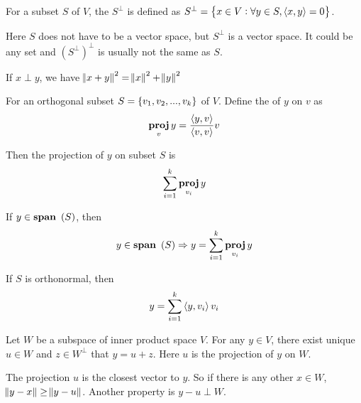 \begin{definition}
    For a subset $S$ of $V$, the  $S^\perp$ is defined as $S^\perp=\set{x \in V: \forall y \in S, \innerproduct{x}{y} = 0}$.
\end{definition}

Here $S$ does not have to be a vector space, but $S^\perp$ is a vector space. It could be any set and $(S^\perp)^\perp$ is usually not the same as $S$. 



\begin{theorem}
    If $x \perp y$, we have $\norm{x+y}^2 = \norm{x}^2 + \norm{y}^2$    
\end{theorem}

\begin{theorem}
    For an orthogonal subset $S=\set{v_1, v_2, ..., v_k}$ of $V$. Define the  of $y$ on $v$ as
    \begin{equation}
        \projection{y}{v} = \frac{\innerproduct{y}{v}}{\innerproduct{v}{v}} v
    \end{equation}
    
    Then the projection of $y$ on subset $S$ is
    \begin{equation}
        \sum_{i=1}^{k} \projection{y}{v_i}
    \end{equation}
    
    If $y \in \spanset{S}$, then
    \begin{equation}
        y \in \spanset{S} \Rightarrow y = \sum_{i=1}^{k} \projection{y}{v_i}
    \end{equation}
    
    If $S$ is orthonormal, then
    \begin{equation}
        y = \sum_{i=1}^k \innerproduct{y}{v_i} v_i
    \end{equation}
\end{theorem}




\begin{theorem}
Let $W$ be a subspace of inner product space $V$. For any $y \in V$, there exist unique $u \in W$ and $z \in W^\perp$ that $y = u + z$. Here $u$ is the projection of $y$ on $W$.    
\end{theorem}

\begin{theorem}
    The projection $u$ is the closest vector to $y$. So if there is any other $x \in W$, $\norm{y - x} \geq \norm{y - u}$. Another property is $y - u \perp W$.
\end{theorem}


